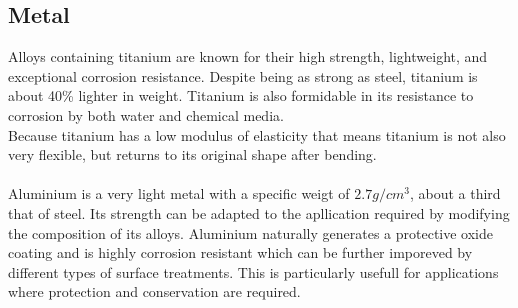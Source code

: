 \documentclass[a4paper]{article}
\begin{document}
\subsection{Metal}
Alloys containing titanium are known for their high strength, lightweight, and exceptional corrosion resistance.
Despite being as strong as steel, titanium is about 40\% lighter in weight.
Titanium is also formidable in its resistance to corrosion by both water and chemical media.
\\
Because titanium has a low modulus of elasticity that means titanium is not also very flexible, but returns to its original shape after bending.
\\ \\
Aluminium is a very light metal with a specific weigt of $2.7 g/cm^3$, about a third that of steel.
Its strength can be adapted to the apllication required by modifying the composition of its alloys.
Aluminium naturally generates a protective oxide coating and is highly corrosion resistant which can be further imporeved by different types of surface treatments. 
This is particularly usefull for applications where protection and conservation are required.
\end{document}
